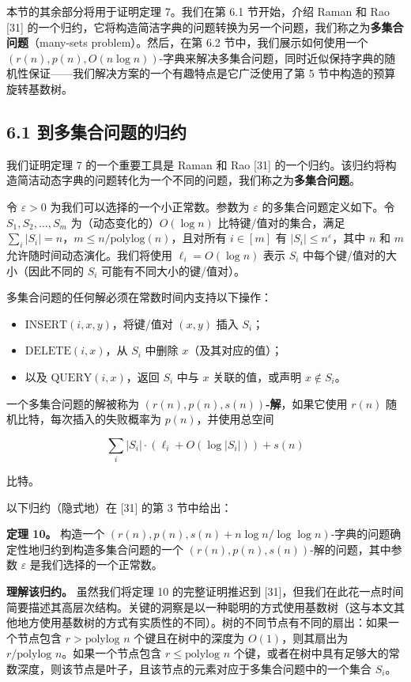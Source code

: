 \documentclass[12pt,a4paper]{ctexart}
\theoremstyle{remark}
\begin{document}
本节的其余部分将用于证明定理 7。我们在第 6.1 节开始，介绍 Raman 和 Rao [31] 的一个归约，它将构造简洁字典的问题转换为另一个问题，我们称之为\textbf{多集合问题}（many-sets problem）。然后，在第 6.2 节中，我们展示如何使用一个 $(r(n),p(n),O(n\log n))$-字典来解决多集合问题，同时近似保持字典的随机性保证——我们解决方案的一个有趣特点是它广泛使用了第 5 节中构造的预算旋转基数树。

\subsection{6.1 到多集合问题的归约}
我们证明定理 7 的一个重要工具是 Raman 和 Rao [31] 的一个归约。该归约将构造简洁动态字典的问题转化为一个不同的问题，我们称之为\textbf{多集合问题}。

令 $\varepsilon>0$ 为我们可以选择的一个小正常数。参数为 $\varepsilon$ 的多集合问题定义如下。令 $S_1,S_2,\ldots,S_m$ 为（动态变化的）$O(\log n)$ 比特键/值对的集合，满足 $\sum_i|S_i|=n$，$m\leq n/\text{polylog}(n)$，且对所有 $i\in[m]$ 有 $|S_i|\leq n^{\varepsilon}$，其中 $n$ 和 $m$ 允许随时间动态演化。我们将使用 $\ell_i=O(\log n)$ 表示 $S_i$ 中每个键/值对的大小（因此不同的 $S_i$ 可能有不同大小的键/值对）。

多集合问题的任何解必须在常数时间内支持以下操作：

\begin{itemize}
\item $\text{INSERT}(i,x,y)$，将键/值对 $(x,y)$ 插入 $S_i$；
\item $\text{DELETE}(i,x)$，从 $S_i$ 中删除 $x$（及其对应的值）；
\item 以及 $\text{QUERY}(i,x)$，返回 $S_i$ 中与 $x$ 关联的值，或声明 $x\notin S_i$。
\end{itemize}

一个多集合问题的解被称为 $(r(n),p(n),s(n))$\textbf{-解}，如果它使用 $r(n)$ 随机比特，每次插入的失败概率为 $p(n)$，并使用总空间

$$\sum_i |S_i|\cdot(\ell_i+O(\log|S_i|))+s(n)$$

比特。

以下归约（隐式地）在 [31] 的第 3 节中给出：

\textbf{定理 10。} 构造一个 $(r(n),p(n),s(n)+n\log n/\log\log n)$-字典的问题确定性地归约到构造多集合问题的一个 $(r(n),p(n),s(n))$-解的问题，其中参数 $\varepsilon$ 是我们选择的一个正常数。

\textbf{理解该归约。} 虽然我们将定理 10 的完整证明推迟到 [31]，但我们在此花一点时间简要描述其高层次结构。关键的洞察是以一种聪明的方式使用基数树（这与本文其他地方使用基数树的方式有实质性的不同）。树的不同节点有不同的扇出：如果一个节点包含 $r>\text{polylog } n$ 个键且在树中的深度为 $O(1)$，则其扇出为 $r/\text{polylog } n$。如果一个节点包含 $r\leq\text{polylog } n$ 个键，或者在树中具有足够大的常数深度，则该节点是叶子，且该节点的元素对应于多集合问题中的一个集合 $S_i$。
\end{document}
